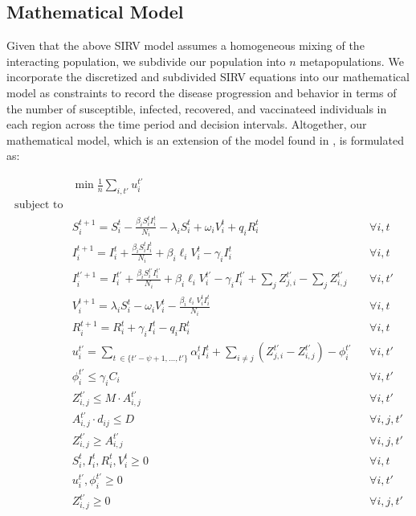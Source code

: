 \documentclass{article}
\begin{document}
\subsection{Mathematical Model}
Given that the above SIRV model assumes a homogeneous mixing of the interacting population, we subdivide our population into $n$ metapopulations. We incorporate the discretized and subdivided SIRV equations into our mathematical model as constraints to record the disease progression and behavior in terms of the number of susceptible, infected, recovered, and vaccinateed individuals in each region across the time period and decision intervals. Altogether, our mathematical model, which is an extension of the model found in \textcite{abazari2024allocation}, is formulated as:

\begin{align}
    & \min \frac{1}{n} \sum_{i,t'} u_i^{t'} \label{eq:objective} \\
    \text{subject to} \nonumber \\
    &S_i^{t+1} = S_i^t - \frac{\beta_i S_i^t I_i^t}{N_i} - \lambda_i S_i^t + \omega_i V_i^t + q_i R_i^t  && \forall i, t \label{eq:susceptible} \\
    & I_i^{t+1} = I_i^t + \frac{\beta_i S_i^t I_i^t}{N_i} + \beta_i \ell_i V_i^t - \gamma_i I_i^t && \forall i, t \label{eq:infected} \\
    & I_i^{t'+1} = I_i^{t'} + \frac{\beta_i S_i^{t'} I_i^{t'}}{N_i} + \beta_i \ell_i V_i^{t'} - \gamma_i I_i^{t'} + \sum_j Z_{j,i}^{t'} - \sum_j Z_{i,j}^{t'} && \forall i, t' \label{eq:infected_transfer} \\
    & V_i^{t+1} = \lambda_i S_i^{t} - \omega_i V_i^t - \frac{\beta_i \ell_i V_i^t I_i^t}{N_i} && \forall i,t \label{eq:vaccinated} \\
    & R_i^{t+1} = R_i^t + \gamma_i I_i^t - q_i R_i^t && \forall i,t \label{eq:recovered} \\
    & u_i^{t'} = \sum_{t\ \in \{t' - \psi + 1, \ldots, t'\}} \alpha_i^{t} I_i^t + \sum_{i \neq j} (Z_{j,i}^{t'} - Z_{i,j}^{t'}) - \phi_i^{t'} && \forall i,t' \label{eq:unmet_demand} \\
    & \phi_i^{t'} \leq \gamma_i C_i && \forall i,t' \label{eq:satisfied_demand} \\
    & Z_{i,j}^{t'} \leq M \cdot A_{i,j}^{t'} && \forall i,t' \label{eq:transfer_limit} \\
    & A_{i,j}^{t'} \cdot d_{ij} \leq D && \forall i,j,t' \label{eq:distance_limit} \\
    & Z_{i,j}^{t'} \geq A_{i,j}^{t'} && \forall i,j,t' \label{eq:binary_constraint} \\
    & S_i^t, I_i^t, R_i^t, V_i^t \geq 0 &&  \forall i, t \label{eq:nonnegativity} \\
    & u_i^{t'}, \phi_i^{t'} \geq 0 && \forall i, t' \label{eq:nonnegativity_2} \\
    & Z_{i,j}^{t'} \geq 0 && \forall i,j, t' \label{eq:nonnegativity_3}
\end{align}
\end{document}
